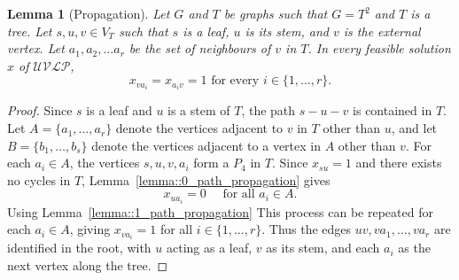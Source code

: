 \documentclass[11pt]{article}
\newtheorem{lemma}{Lemma}
\begin{document}
\begin{lemma}[Propagation] \label{lemma::propagation}
  Let $G$ and $T$ be graphs such that $G=T^2$ and $T$ is a tree. Let $s,u,v \in V_T$ such that $s$ is a leaf, $u$ is its stem, and $v$ is the external vertex. Let $a_1,a_2,\dots a_r$ be the set of neighbours of $v$ in $T$. In every feasible solution $x$ of $\mathcal{UVLP}$, 
  \[
  x_{va_i}=x_{a_iv}=1 \text{ for every } i \in \{1,\ldots,r\}. 
  \]
\end{lemma}
\begin{proof}
  Since $s$ is a leaf and $u$ is a stem of $T$, the path $s-u-v$ is contained in $T$. Let $A=\{a_1,\ldots,a_r\}$ denote the vertices adjacent to $v$ in $T$ other than $u$, and let $B=\{b_1,\ldots,b_s\}$ denote the vertices adjacent to a vertex in $A$ other than $v$. For each $a_i\in A$, the vertices $s,u,v,a_i$ form a $P_4$ in $T$. Since $x_{su}=1$ and there exists no cycles in $T$, Lemma~\eqref{lemma::0_path_propagation} gives
  \[
  x_{ua_i}=0 \quad \text{ for all } a_i \in A.
  \]
  Using Lemma~\eqref{lemma::1_path_propagation} 
  This process can be repeated for each $a_i\in A$, giving $x_{va_i}=1$ for all $i\in\{1,\ldots,r\}$. Thus the edges $uv, va_1,\ldots,va_r$ are identified in the root, with $u$ acting as a leaf, $v$ as its stem, and each $a_i$ as the next vertex along the tree.
\end{proof}
\end{document}
